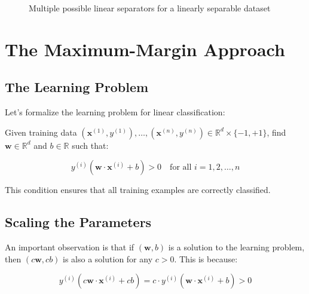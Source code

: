 \documentclass{article}
\begin{document}
\begin{figure}[h]
\centering
{}
\caption{Multiple possible linear separators for a linearly separable dataset}
\end{figure}

\section{The Maximum-Margin Approach}

\subsection{The Learning Problem}
Let's formalize the learning problem for linear classification:

Given training data $(\mathbf{x}^{(1)}, y^{(1)}), \ldots, (\mathbf{x}^{(n)}, y^{(n)}) \in \mathbb{R}^d \times \{-1, +1\}$, find $\mathbf{w} \in \mathbb{R}^d$ and $b \in \mathbb{R}$ such that:

\[
y^{(i)}(\mathbf{w} \cdot \mathbf{x}^{(i)} + b) > 0 \quad \text{for all } i = 1, 2, \ldots, n
\]

This condition ensures that all training examples are correctly classified.

\subsection{Scaling the Parameters}
An important observation is that if $(\mathbf{w}, b)$ is a solution to the learning problem, then $(c\mathbf{w}, cb)$ is also a solution for any $c > 0$. This is because:

\[
y^{(i)}(c\mathbf{w} \cdot \mathbf{x}^{(i)} + cb) = c \cdot y^{(i)}(\mathbf{w} \cdot \mathbf{x}^{(i)} + b) > 0
\]
\end{document}

